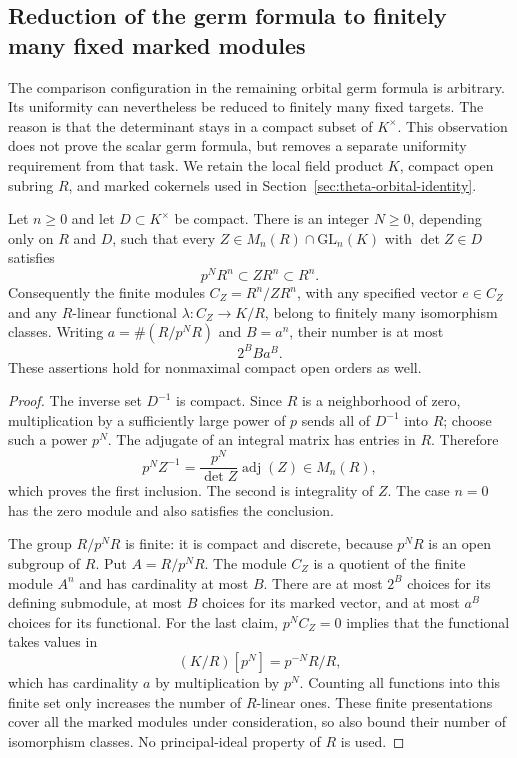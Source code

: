 \subsection{Reduction of the germ formula to finitely many fixed marked modules}
\label{gu-section}

The comparison configuration in the remaining orbital germ formula is
arbitrary. Its uniformity can nevertheless be reduced to finitely many
fixed targets. The reason is that the determinant stays in a compact
subset of $K^\times$. This observation does not prove the scalar germ
formula, but removes a separate uniformity requirement from that task.
We retain the local field product $K$, compact open subring $R$, and
marked cokernels used in Section~\ref{sec:theta-orbital-identity}.

\begin{lemma}\label{gu-bounded-types}
Let $n\ge0$ and let $D\subset K^\times$ be compact. There is an
integer $N\ge0$, depending only on $R$ and $D$, such that every
$Z\in M_n(R)\cap\mathrm{GL}_n(K)$ with $\det Z\in D$ satisfies
\[
             p^N R^n\subset ZR^n\subset R^n.
\]
Consequently the finite modules $C_Z=R^n/ZR^n$, with any specified
vector $e\in C_Z$ and any $R$-linear functional
$\lambda:C_Z\to K/R$, belong to finitely many isomorphism classes.
Writing $a=\#(R/p^NR)$ and $B=a^n$, their number is at most
\[
                         2^B B a^B.
\]
These assertions hold for nonmaximal compact open orders as well.
\end{lemma}

\begin{proof}
The inverse set $D^{-1}$ is compact. Since $R$ is a neighborhood
of zero, multiplication by a sufficiently large power of $p$ sends
all of $D^{-1}$ into $R$; choose such a power $p^N$.
The adjugate of an integral matrix has entries in $R$. Therefore
\[
 p^N Z^{-1}=\frac{p^N}{\det Z}\operatorname{adj}(Z)
                                      \in M_n(R),
\]
which proves the first inclusion. The second is integrality of $Z$.
The case $n=0$ has the zero module and also satisfies the conclusion.

The group $R/p^NR$ is finite: it is compact and discrete, because
$p^NR$ is an open subgroup of $R$. Put $A=R/p^NR$.
The module $C_Z$ is a quotient of the finite module $A^n$ and has
cardinality at most $B$. There are at most $2^B$ choices for its
defining submodule, at most $B$ choices for its marked vector,
and at most $a^B$ choices for its functional. For the last claim,
$p^NC_Z=0$ implies that the functional takes values in
\[
          (K/R)[p^N]=p^{-N}R/R,
\]
which has cardinality $a$ by multiplication by $p^N$.
Counting all functions into this finite set only increases the
number of $R$-linear ones. These finite presentations cover all
the marked modules under consideration, so also bound their
number of isomorphism classes. No principal-ideal property of
$R$ is used.
\end{proof}

